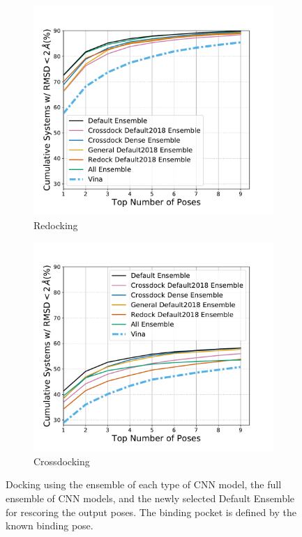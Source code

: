 \documentclass[journal=jcisd8,manuscript=article]{achemso}
\begin{document}
\begin{figure}
	\begin{subfigure}[b]{0.48\textwidth}
		\centering
		\includegraphics[width=\textwidth]{figures/redocking/rescore_ensembles_line.pdf}
		\caption{Redocking}
		\label{fig:RescoreEnsembleRedock}
        \end{subfigure}    
	\begin{subfigure}[b]{0.48\textwidth} 
		\centering
		\includegraphics[width=\textwidth]{figures/crossdocking/rescore_ensembles_line.pdf}
		\caption{Crossdocking}
		\label{fig:RescoreEnsembleCrossdock}
        \end{subfigure}    
	\caption{Docking using the ensemble of each type of CNN model, the full ensemble of CNN models, and the newly selected Default Ensemble for rescoring the output poses. The binding pocket is defined by the known binding pose.}
	\label{fig:RescoreEnsemble}
\end{figure}    
\end{document}
